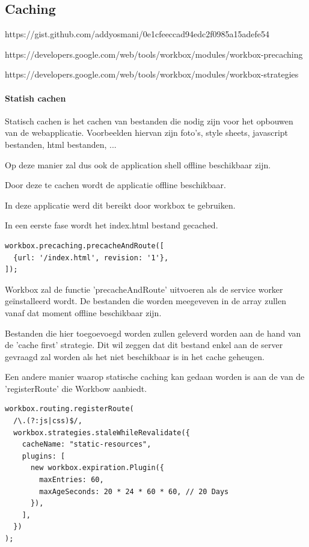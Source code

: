 	\subsection{Caching}
	https://gist.github.com/addyosmani/0e1cfeeccad94edc2f0985a15adefe54
	
	https://developers.google.com/web/tools/workbox/modules/workbox-precaching
	
	https://developers.google.com/web/tools/workbox/modules/workbox-strategies
	
		\paragraph{Statish cachen}
			Statisch cachen is het cachen van bestanden die nodig zijn voor het opbouwen van de webapplicatie. Voorbeelden hiervan zijn foto's, style sheets, javascript bestanden, html bestanden, ...
			
			Op deze manier zal dus ook de application shell offline beschikbaar zijn.
			
			Door deze te cachen wordt de applicatie offline beschikbaar.
			
			In deze applicatie werd dit bereikt door workbox te gebruiken.
			
			In een eerste fase wordt het index.html bestand gecached.
\begin{lstlisting}
workbox.precaching.precacheAndRoute([
  {url: '/index.html', revision: '1'},
]);
\end{lstlisting}
		
			Workbox zal de functie 'precacheAndRoute' uitvoeren als de service worker geïnstalleerd wordt. De bestanden die worden meegeveven in de array zullen vanaf dat moment offline beschikbaar zijn.
			
			Bestanden die hier toegoevoegd worden zullen geleverd worden aan de hand van de 'cache first' strategie. Dit wil zeggen dat dit bestand enkel aan de server gevraagd zal worden als het niet beschikbaar is in het cache geheugen.
			
			Een andere manier waarop statische caching kan gedaan worden is aan de van de 'registerRoute' die Workbow aanbiedt. 
			
\begin{lstlisting}
workbox.routing.registerRoute(
  /\.(?:js|css)$/,
  workbox.strategies.staleWhileRevalidate({
    cacheName: "static-resources",
    plugins: [
      new workbox.expiration.Plugin({
        maxEntries: 60,
        maxAgeSeconds: 20 * 24 * 60 * 60, // 20 Days
      }),
    ],
  })
);
\end{lstlisting}
			
